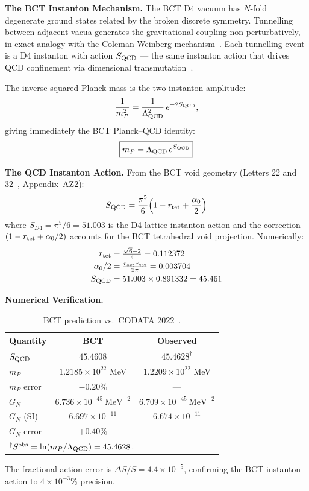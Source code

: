 \documentclass[aps,prl,twocolumn,superscriptaddress,floatfix]{revtex4-2}
\begin{document}
\medskip
\noindent\textbf{The BCT Instanton Mechanism.}
The BCT D4 vacuum has $N$-fold degenerate ground states related by the broken
discrete symmetry. Tunnelling between adjacent vacua generates the gravitational
coupling non-perturbatively, in exact analogy with the Coleman-Weinberg
mechanism~\cite{ColemanWeinberg}. Each tunnelling event is a D4 instanton
with action $S_{\rm QCD}$ — the same instanton action that drives QCD
confinement via dimensional transmutation~\cite{L22}.

The inverse squared Planck mass is the two-instanton amplitude:
\begin{equation}
  \frac{1}{m_P^2} = \frac{1}{\Lambda_{\rm QCD}^2}\,e^{-2S_{\rm QCD}},
  \label{eq:GN_inst}
\end{equation}
giving immediately the BCT Planck--QCD identity:
\begin{equation}
  \boxed{m_P = \Lambda_{\rm QCD}\,e^{S_{\rm QCD}}}
  \label{eq:mP}
\end{equation}

\medskip
\noindent\textbf{The QCD Instanton Action.}
From the BCT void geometry (Letters 22 and 32~\cite{L22,L32}, Appendix~AZ2):
\begin{equation}
  S_{\rm QCD} = \frac{\pi^5}{6}\!\left(1 - r_{\rm tet} + \frac{\alpha_0}{2}\right)
  \label{eq:SQCD}
\end{equation}
where $S_{D4} = \pi^5/6 = 51.003$ is the D4 lattice instanton action
and the correction $(1 - r_{\rm tet} + \alpha_0/2)$ accounts for the
BCT tetrahedral void projection. Numerically:
\begin{align}
  r_{\rm tet} &= \tfrac{\sqrt{6}-2}{4} = 0.112372 \label{eq:rtet} \\
  \alpha_0/2 &= \tfrac{r_{\rm oct}\,r_{\rm tet}}{2\pi} = 0.003704 \label{eq:a0} \\
  S_{\rm QCD} &= 51.003 \times 0.891332 = 45.461 \label{eq:SQCDnum}
\end{align}

\medskip
\noindent\textbf{Numerical Verification.}
\begin{table}[h]
\centering
\caption{BCT prediction vs.\ CODATA 2022~\cite{CODATA2022}.}
\label{tab:GN}
\begin{tabular}{lcc}
\toprule
Quantity & BCT & Observed \\
\midrule
$S_{\rm QCD}$ & $45.4608$ & $45.4628^\dagger$ \\
$m_P$ & $1.2185\!\times\!10^{22}$ MeV & $1.2209\!\times\!10^{22}$ MeV \\
$m_P$ error & $-0.20\%$ & — \\
$G_N$ & $6.736\!\times\!10^{-45}\ \mathrm{MeV}^{-2}$ & $6.709\!\times\!10^{-45}\ \mathrm{MeV}^{-2}$ \\
$G_N$ (SI) & $6.697\!\times\!10^{-11}$ & $6.674\!\times\!10^{-11}$ \\
$G_N$ error & $+0.40\%$ & — \\
\bottomrule
\multicolumn{3}{l}{$^\dagger S^{\rm obs} = \ln(m_P/\Lambda_{\rm QCD}) = 45.4628$.}
\end{tabular}
\end{table}
The fractional action error is $\Delta S/S = 4.4\times10^{-5}$, confirming
the BCT instanton action to $4\times10^{-3}\%$ precision.
\end{document}
